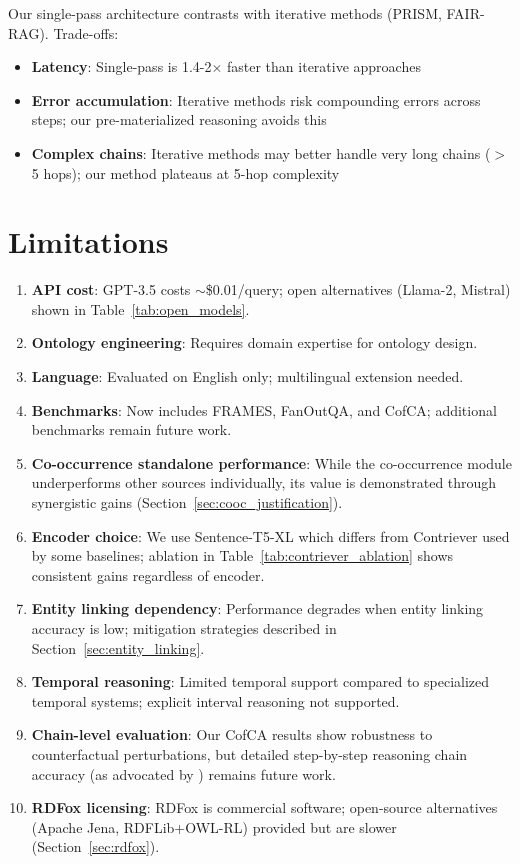 \documentclass[10pt,twocolumn]{article}
\begin{document}
Our single-pass architecture contrasts with iterative methods (PRISM, FAIR-RAG). Trade-offs:

\begin{itemize}
    \item \textbf{Latency}: Single-pass is 1.4-2$\times$ faster than iterative approaches
    \item \textbf{Error accumulation}: Iterative methods risk compounding errors across steps; our pre-materialized reasoning avoids this
    \item \textbf{Complex chains}: Iterative methods may better handle very long chains ($>$5 hops); our method plateaus at 5-hop complexity
\end{itemize}

\section{Limitations}

\begin{enumerate}
    \item \textbf{API cost}: GPT-3.5 costs $\sim$\$0.01/query; open alternatives (Llama-2, Mistral) shown in Table~\ref{tab:open_models}.
    \item \textbf{Ontology engineering}: Requires domain expertise for ontology design.
    \item \textbf{Language}: Evaluated on English only; multilingual extension needed.
    \item \textbf{Benchmarks}: Now includes FRAMES, FanOutQA, and CofCA; additional benchmarks remain future work.
    \item \textbf{Co-occurrence standalone performance}: While the co-occurrence module underperforms other sources individually, its value is demonstrated through synergistic gains (Section~\ref{sec:cooc_justification}).
    \item \textbf{Encoder choice}: We use Sentence-T5-XL which differs from Contriever used by some baselines; ablation in Table~\ref{tab:contriever_ablation} shows consistent gains regardless of encoder.
    \item \textbf{Entity linking dependency}: Performance degrades when entity linking accuracy is low; mitigation strategies described in Section~\ref{sec:entity_linking}.
    \item \textbf{Temporal reasoning}: Limited temporal support compared to specialized temporal systems; explicit interval reasoning not supported.
    \item \textbf{Chain-level evaluation}: Our CofCA results show robustness to counterfactual perturbations, but detailed step-by-step reasoning chain accuracy (as advocated by \cite{wu2024cofca}) remains future work.
    \item \textbf{RDFox licensing}: RDFox is commercial software; open-source alternatives (Apache Jena, RDFLib+OWL-RL) provided but are slower (Section~\ref{sec:rdfox}).
\end{enumerate}
\end{document}
